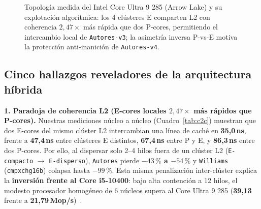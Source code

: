 \documentclass[10pt,twocolumn,a4paper]{article}
\begin{document}
\begin{figure}[t]
{%
}
\caption{Topología medida del Intel Core Ultra 9 285 (Arrow Lake) y su explotación algorítmica: los 4 clústeres E comparten L2 con coherencia $2{,}47\times$ más rápida que dos P-cores, permitiendo el intercambio local de \texttt{Autores-v3}; la asimetría inversa P-vs-E motiva la protección anti-inanición de \texttt{Autores-v4}.}
\label{fig:arrowlake}
\end{figure}

\subsection{Cinco hallazgos reveladores de la arquitectura híbrida}

\textbf{1. Paradoja de coherencia L2 (E-cores locales $2{,}47\times$ más rápidos que P-cores).} Nuestras mediciones núcleo a núcleo (Cuadro~\ref{tab:c2c}) muestran que dos E-cores del mismo clúster L2 intercambian una línea de caché en \textbf{35{,}0\,ns}, frente a \textbf{47{,}4\,ns} entre clústeres E distintos, \textbf{67{,}4\,ns} entre P y E, y \textbf{86{,}3\,ns} entre dos P-cores. Por ello, al dispersar solo 2--4 hilos fuera de un clúster L2 (\texttt{E-compacto} $\to$ \texttt{E-disperso}), \texttt{Autores} pierde \textbf{$-43\,\%$ a $-54\,\%$} y \texttt{Williams} (\texttt{cmpxchg16b}) colapsa hasta \textbf{$-99\,\%$}. Esta misma penalización inter-clúster explica la \textbf{inversión frente al Core i5-10400}: bajo alta contención a 12 hilos, el modesto procesador homogéneo de 6 núcleos supera al Core Ultra 9 285 (\textbf{39{,}13} frente a \textbf{21{,}79\,Mop/s})~\cite{replica2026ultra9}.
\end{document}
